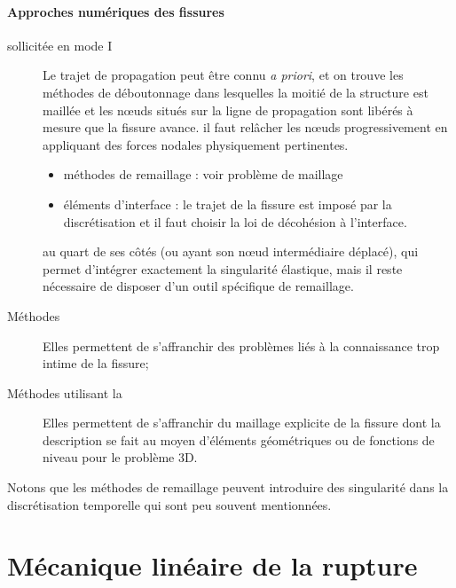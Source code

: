 \paragraph{Approches numériques des fissures}
\begin{description}
   \item[ sollicitée en mode I]
	Le trajet de propagation peut être connu \emph{a priori}, et on trouve les
	méthodes de déboutonnage dans lesquelles la moitié de la structure est
	maillée et les nœuds situés sur la ligne de propagation sont libérés
	à mesure que la fissure avance.  il faut relâcher les nœuds
	progressivement en appliquant des forces nodales physiquement
	pertinentes.
   \item[]\mbox{}
\begin{itemize}
\item méthodes de remaillage :
	voir problème de maillage
   \item éléments d'interface :
	le trajet de la fissure est imposé par la discrétisation et il faut choisir
	la loi de décohésion à l'interface.
	\end{itemize}
   \item[]
	au quart de ses côtés (ou ayant son nœud intermédiaire déplacé), qui
	permet d'intégrer exactement la singularité élastique, mais il reste
	nécessaire de disposer d'un outil spécifique de remaillage.
   \item[Méthodes ] Elles permettent de s'affranchir
	des problèmes liés à la connaissance trop intime de la fissure;
   \item[Méthodes utilisant la ]
	Elles permettent de s'affranchir du maillage explicite de la fissure dont la
	description se fait au moyen d'éléments géométriques ou de fonctions
	de niveau pour le problème 3D.
\end{description}
Notons que les méthodes de remaillage peuvent introduire des singularité dans la
discrétisation temporelle qui sont peu souvent mentionnées.



\medskip
\section{Mécanique linéaire de la rupture}

\medskip
